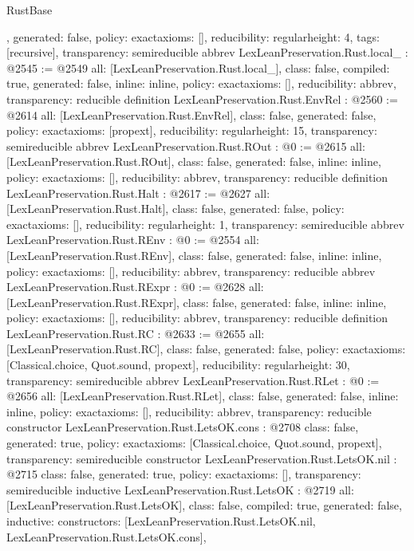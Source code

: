 \begin{lexlean}{RustBase}
\begin{coremodule}
{{  },
  generated: false,
  policy: exact{axioms: []},
  reducibility: regular{height: 4},
  tags: [recursive],
  transparency: semireducible
}
abbrev LexLeanPreservation.Rust.local_ : @2545 := @2549 {
  all: [LexLeanPreservation.Rust.local_],
  class: false,
  compiled: true,
  generated: false,
  inline: inline,
  policy: exact{axioms: []},
  reducibility: abbrev{},
  transparency: reducible
}
definition LexLeanPreservation.Rust.EnvRel : @2560 := @2614 {
  all: [LexLeanPreservation.Rust.EnvRel],
  class: false,
  generated: false,
  policy: exact{axioms: [propext]},
  reducibility: regular{height: 15},
  transparency: semireducible
}
abbrev LexLeanPreservation.Rust.ROut : @0 := @2615 {
  all: [LexLeanPreservation.Rust.ROut],
  class: false,
  generated: false,
  inline: inline,
  policy: exact{axioms: []},
  reducibility: abbrev{},
  transparency: reducible
}
definition LexLeanPreservation.Rust.Halt : @2617 := @2627 {
  all: [LexLeanPreservation.Rust.Halt],
  class: false,
  generated: false,
  policy: exact{axioms: []},
  reducibility: regular{height: 1},
  transparency: semireducible
}
abbrev LexLeanPreservation.Rust.REnv : @0 := @2554 {
  all: [LexLeanPreservation.Rust.REnv],
  class: false,
  generated: false,
  inline: inline,
  policy: exact{axioms: []},
  reducibility: abbrev{},
  transparency: reducible
}
abbrev LexLeanPreservation.Rust.RExpr : @0 := @2628 {
  all: [LexLeanPreservation.Rust.RExpr],
  class: false,
  generated: false,
  inline: inline,
  policy: exact{axioms: []},
  reducibility: abbrev{},
  transparency: reducible
}
definition LexLeanPreservation.Rust.RC : @2633 := @2655 {
  all: [LexLeanPreservation.Rust.RC],
  class: false,
  generated: false,
  policy: exact{axioms: [Classical.choice, Quot.sound, propext]},
  reducibility: regular{height: 30},
  transparency: semireducible
}
abbrev LexLeanPreservation.Rust.RLet : @0 := @2656 {
  all: [LexLeanPreservation.Rust.RLet],
  class: false,
  generated: false,
  inline: inline,
  policy: exact{axioms: []},
  reducibility: abbrev{},
  transparency: reducible
}
constructor LexLeanPreservation.Rust.LetsOK.cons : @2708 {
  class: false,
  generated: true,
  policy: exact{axioms: [Classical.choice, Quot.sound, propext]},
  transparency: semireducible
}
constructor LexLeanPreservation.Rust.LetsOK.nil : @2715 {
  class: false,
  generated: true,
  policy: exact{axioms: []},
  transparency: semireducible
}
inductive LexLeanPreservation.Rust.LetsOK : @2719 {
  all: [LexLeanPreservation.Rust.LetsOK],
  class: false,
  compiled: true,
  generated: false,
  inductive: {
    constructors: [LexLeanPreservation.Rust.LetsOK.nil, LexLeanPreservation.Rust.LetsOK.cons],
}}
\end{coremodule}
\end{lexlean}

